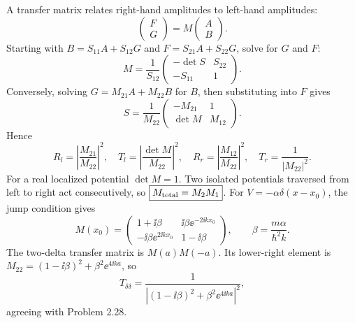A transfer matrix relates right-hand amplitudes
to left-hand amplitudes:
\begin{equation}
\begin{pmatrix}F\\G\end{pmatrix}
=M\begin{pmatrix}A\\B\end{pmatrix}.
\end{equation}
Starting with
$B=S_{11}A+S_{12}G$ and
$F=S_{21}A+S_{22}G$, solve for $G$ and $F$:
\begin{equation}
\boxed{M=\frac1{S_{12}}
\begin{pmatrix}-\det S&S_{22}\\-S_{11}&1\end{pmatrix}}.
\end{equation}
Conversely, solving $G=M_{21}A+M_{22}B$
for $B$, then substituting into $F$ gives
\begin{equation}
\boxed{S=\frac1{M_{22}}
\begin{pmatrix}-M_{21}&1\\\det M&M_{12}\end{pmatrix}}.
\end{equation}
Hence
\begin{equation}
R_l=\left|\frac{M_{21}}{M_{22}}\right|^2,\quad
T_l=\left|\frac{\det M}{M_{22}}\right|^2,\quad
R_r=\left|\frac{M_{12}}{M_{22}}\right|^2,\quad
T_r=\frac1{|M_{22}|^2}.
\end{equation}
For a real localized potential $\det M=1$.
Two isolated potentials traversed from left to
right act consecutively, so
$\boxed{M_{\rm total}=M_2M_1}$.
For $V=-\alpha\delta(x-x_0)$, the
jump condition gives
\begin{equation}
\boxed{M(x_0)=
\begin{pmatrix}
1+\ii\beta&\ii\beta\ee^{-2\ii kx_0}\\
-\ii\beta\ee^{2\ii kx_0}&1-\ii\beta
\end{pmatrix}},
\qquad\beta=\frac{m\alpha}{\hbar^2k}.
\end{equation}
The two-delta transfer matrix is
$M(a)M(-a)$. Its lower-right element is
$M_{22}=(1-\ii\beta)^2+\beta^2\ee^{4\ii ka}$,
so
\begin{equation}
\boxed{T_{\delta\delta}=
\frac1{\left|(1-\ii\beta)^2+\beta^2\ee^{4\ii ka}\right|^2}},
\end{equation}
agreeing with Problem 2.28.
